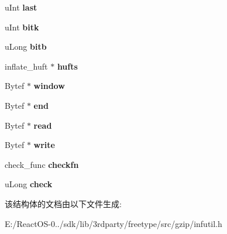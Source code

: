 \begin{DoxyCompactItemize}
\begin{tabbing}
\end{tabbing}\item 
\mbox{\label{structinflate__blocks__state_aff9036e9472bff599712d2cabbae8efb}} 
u\+Int {\bfseries last}
\item 
\mbox{\label{structinflate__blocks__state_aa746d10a5f7cab2603c2282c24a10a94}} 
u\+Int {\bfseries bitk}
\item 
\mbox{\label{structinflate__blocks__state_a14a41e3af6a60ac4bc69e299820a3999}} 
u\+Long {\bfseries bitb}
\item 
\mbox{\label{structinflate__blocks__state_a81d8f6825a3a5c42e29882ae444b80c0}} 
inflate\+\_\+huft $\ast$ {\bfseries hufts}
\item 
\mbox{\label{structinflate__blocks__state_a9585c3f7e1653e8bf31685b8fc4bb5da}} 
Bytef $\ast$ {\bfseries window}
\item 
\mbox{\label{structinflate__blocks__state_a3e7b6ce115fec031c6413fc7259f0206}} 
Bytef $\ast$ {\bfseries end}
\item 
\mbox{\label{structinflate__blocks__state_a9508224b8104718e7a576149586b9b77}} 
Bytef $\ast$ {\bfseries read}
\item 
\mbox{\label{structinflate__blocks__state_a82ae3c57d9b8acffa4deb7e4a9354297}} 
Bytef $\ast$ {\bfseries write}
\item 
\mbox{\label{structinflate__blocks__state_af1238e2d5076a2b3c0d21430252e890c}} 
check\+\_\+func {\bfseries checkfn}
\item 
\mbox{\label{structinflate__blocks__state_a917b3b14339ec368de13c3ba07c1711e}} 
u\+Long {\bfseries check}
\end{DoxyCompactItemize}


该结构体的文档由以下文件生成\+:\begin{DoxyCompactItemize}
\item 
E\+:/\+React\+O\+S-\/0../sdk/lib/3rdparty/freetype/src/gzip/infutil.\+h\end{DoxyCompactItemize}
